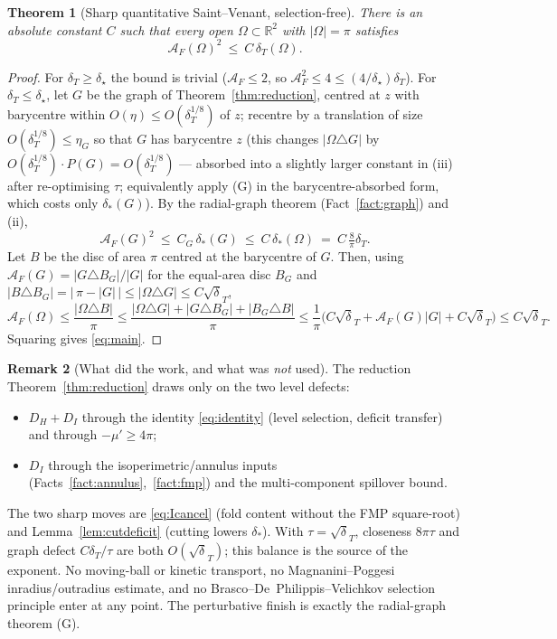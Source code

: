 \documentclass[11pt]{article}
\newtheorem{theorem}{Theorem}
\theoremstyle{definition}
\newtheorem{remark}[theorem]{Remark}
\newcommand{\R}{\mathbb R}
\newcommand{\Om}{\Omega}
\newcommand{\dT}{\delta_T}
\newcommand{\AF}{\mathcal A_F}
\newcommand{\abs}[1]{\left|#1\right|}
\newcommand{\dstar}{\delta_{*}}
\begin{document}
\begin{theorem}[Sharp quantitative Saint--Venant, selection-free]
\label{thm:main}
There is an absolute constant $C$ such that every open $\Om\subset\R^2$ with
$\abs\Om=\pi$ satisfies
\begin{equation}\label{eq:main}
   \AF(\Om)^2\ \le\ C\,\dT(\Om).
\end{equation}
\end{theorem}

\begin{proof}
For $\dT\ge\delta_\star$ the bound is trivial
($\AF\le2$, so $\AF^2\le4\le(4/\delta_\star)\dT$). For $\dT\le\delta_\star$,
let $G$ be the graph of Theorem~\ref{thm:reduction}, centred at $z$ with
barycentre within $O(\eta)\le O(\dT^{1/8})$ of $z$; recentre by a
translation of size $O(\dT^{1/8})\le\eta_G$ so that $G$ has barycentre $z$
(this changes $\abs{\Om\triangle G}$ by $O(\dT^{1/8})\cdot P(G)=O(\dT^{1/8})$
— absorbed into a slightly larger constant in (iii) after re-optimising
$\tau$; equivalently apply (G) in the barycentre-absorbed form, which costs
only $\dstar(G)$). By the radial-graph theorem (Fact~\ref{fact:graph}) and
(ii),
\[
   \AF(G)^2\ \le\ C_G\,\dstar(G)\ \le\ C\,\dstar(\Om)\ =\ C\,\tfrac8\pi\dT .
\]
Let $B$ be the disc of area $\pi$ centred at the barycentre of $G$. Then,
using $\AF(G)=\abs{G\triangle B_G}/\abs G$ for the equal-area disc $B_G$
and $\abs{B\triangle B_G}=\bigl|\,\pi-\abs G\,\bigr|\le\abs{\Om\triangle
G}\le C\sqrt\dT$,
\[
   \AF(\Om)\le\frac{\abs{\Om\triangle B}}{\pi}
   \le\frac{\abs{\Om\triangle G}+\abs{G\triangle B_G}+\abs{B_G\triangle B}}{\pi}
   \le\frac1\pi\bigl(C\sqrt\dT+\AF(G)\abs G+C\sqrt\dT\bigr)
   \le C\sqrt\dT .
\]
Squaring gives \eqref{eq:main}.
\end{proof}

\begin{remark}[What did the work, and what was \emph{not} used]
The reduction Theorem~\ref{thm:reduction} draws only on the two level
defects:
\begin{itemize}[leftmargin=1.4em]
\item $D_H+D_I$ through the identity \eqref{eq:identity} (level selection,
deficit transfer) and through $-\mu'\ge4\pi$;
\item $D_I$ through the isoperimetric/annulus inputs
(Facts~\ref{fact:annulus},~\ref{fact:fmp}) and the multi-component spillover
bound.
\end{itemize}
The two sharp moves are \eqref{eq:Icancel} (fold content without the FMP
square-root) and Lemma~\ref{lem:cutdeficit} (cutting lowers $\dstar$). With
$\tau=\sqrt\dT$, closeness $8\pi\tau$ and graph defect $C\dT/\tau$ are both
$O(\sqrt\dT)$; this balance is the source of the exponent. No moving-ball or
kinetic transport, no Magnanini--Poggesi inradius/outradius estimate, and no
Brasco--De~Philippis--Velichkov selection principle enter at any point. The
perturbative finish is exactly the radial-graph theorem (G).
\end{remark}
\end{document}
